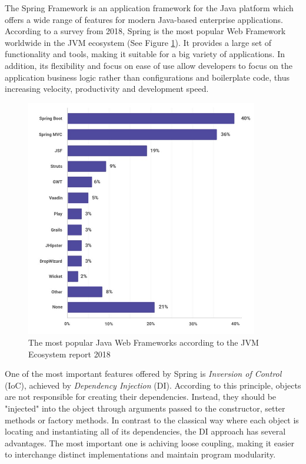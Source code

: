 The Spring Framework is an application framework for the Java platform which offers a wide range of features for modern Java-based enterprise applications. According to a survey from 2018, Spring is the most popular Web Framework worldwide in the JVM ecosystem (See Figure \ref{javaWebFrameworksTrendsImg}). It provides a large set of functionality and tools, making it suitable for a big variety of applications. In addition,  its flexibility and focus on ease of use allow developers to focus on the application business logic rather than configurations and boilerplate code, thus increasing velocity, productivity and development speed.

\begin{figure}[H]
    \centering
    \includegraphics[width=4in]{images/javaWebFrameworksTrends}
    \caption{The most popular Java Web Frameworks according to the JVM Ecosystem report 2018 \cite{jvmEcosystemReport}}
    \label{javaWebFrameworksTrendsImg}
\end{figure}

One of the most important features offered by Spring is \textit{Inversion of Control} (IoC), achieved by \textit{Dependency Injection} (DI). According to this principle, objects are not responsible for creating their dependencies. Instead, they should be "injected" into the object through arguments passed to the constructor, setter methods or factory methods. In contrast to the classical way where each object is locating and instantiating all of its dependencies, the DI approach has several advantages. The most important one is achiving loose coupling, making it easier to interchange distinct implementations and maintain program modularity.

